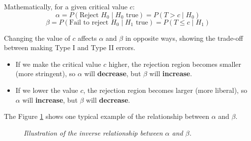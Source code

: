 \documentclass[twoside]{book}
\begin{document}
Mathematically, for a given critical value \(c\):
\[
\alpha = P(\text{Reject } H_0 \mid H_0 \text{ true}) = P(T > c \mid H_0)
\]
\[
\beta = P(\text{Fail to reject } H_0 \mid H_1 \text{ true}) = P(T \le c \mid H_1)
\]

Changing the value of \(c\) affects \(\alpha\) and \(\beta\) in opposite ways, showing the trade-off between making Type I and Type II errors.


\begin{itemize}
	\item If we make the critical value \( c \) higher, the rejection region becomes smaller (more stringent), so \( \alpha \) will \textbf{decrease}, but \( \beta \) will \textbf{increase}.
	\item If we lower the value \( c \), the rejection region becomes larger (more liberal), so \( \alpha \) will \textbf{increase}, but \( \beta \) will \textbf{decrease}.
\end{itemize}

The Figure \ref{fig:alpha_beta_tradeoff} shows one typical example of the relationship between $\alpha$ and $\beta$.

\begin{figure}[H]
	\centering
	\caption{\textit{Illustration of the inverse relationship between \(\alpha\) and \(\beta\).}}
	\label{fig:alpha_beta_tradeoff}
\end{figure}
\end{document}
